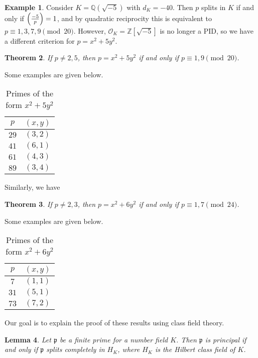 \documentclass[leqno, openany]{memoir}
\newtheorem{thm}{Theorem}[section]
\newtheorem{lem}[thm]{Lemma}
\theoremstyle{definition}
\newtheorem{exm}[thm]{Example}
\theoremstyle{remark}
\theoremstyle{plain}
\theoremstyle{definition}
\theoremstyle{remark}
\newcommand{\Z}{\mathbb{Z}}
\newcommand{\Q}{\mathbb{Q}}
\newcommand{\mc}[1]{\mathcal{#1}}
\newcommand{\mf}[1]{\mathfrak{#1}}
\begin{document}
\begin{exm}
    Consider $K = \Q(\sqrt{-5})$ with $d_K = -40$. Then $p$ splits in $K$ if and only if $\qty(\frac{-5}{p}) = 1$, and by quadratic reciprocity this is equivalent to $p \equiv 1,3,7,9 \pmod{20}$. However, $\mc{O}_K = \Z[\sqrt{-5}]$ is no longer a PID, so we have a different criterion for $p = x^2 + 5y^2$. 
\end{exm}

\begin{thm}
    If $p \neq 2,5$, then $p=x^2 + 5y^2$ if and only if $p \equiv 1,9 \pmod{20}$.
\end{thm}

    Some examples are given below.
    \begin{table}[H]
        \centering
        \caption{Primes of the form $x^2 + 5y^2$}
        \label{tab:label}
        \begin{tabular}{cc}
        \toprule
        $p$ & $(x,y)$ \\
        \midrule
        $29$ & $(3,2)$ \\
        $41$ & $(6,1)$ \\
        $61$ & $(4,3)$ \\
        $89$ & $(3,4)$ \\
        \bottomrule
        \end{tabular}
    \end{table}

Similarly, we have
\begin{thm}
    If $p \neq 2,3$, then $p = x^2 + 6y^2$ if and only if $p \equiv 1,7 \pmod{24}$.
\end{thm}

Some examples are given below.
\begin{table}[H]
    \centering
    \caption{Primes of the form $x^2 + 6y^2$}
    \label{tab:label}
    \begin{tabular}{cc}
    \toprule
    $p$ & $(x,y)$ \\
    \midrule
    $7$ & $(1,1)$ \\
    $31$ & $(5,1)$ \\
    $73$ & $(7,2)$ \\
    \bottomrule
    \end{tabular}
\end{table}

Our goal is to explain the proof of these results using class field theory.

\begin{lem}
    Let $\mf{p}$ be a finite prime for a number field $K$. Then $\mf{p}$ is principal if and only if $\mf{p}$ splits completely in $H_K$, where $H_K$ is the Hilbert class field of $K$.
\end{lem}
\end{document}
